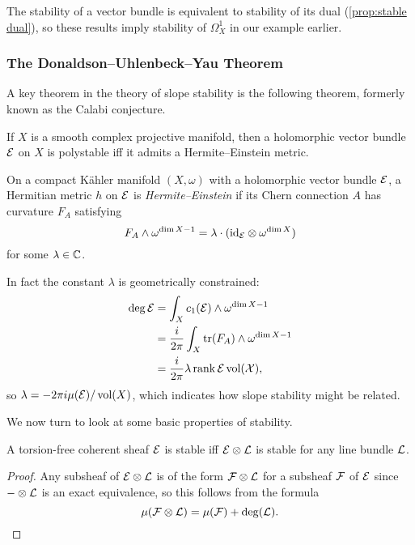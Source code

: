 The stability of a vector bundle is equivalent to stability of its dual
(\cref{prop:stable dual}), so these results imply stability of $\Omega^1_X$ in
our example earlier.

\subsubsection{The Donaldson--Uhlenbeck--Yau Theorem}

A key theorem in the theory of slope stability is the following theorem,
formerly known as the Calabi conjecture.

\begin{theorem}
    If $X$ is a smooth complex projective manifold, then a holomorphic vector
    bundle $\mathcal{E}$ on $X$ is polystable iff it admits a Hermite--Einstein
    metric.
\end{theorem}

\begin{definition}
    On a compact K\"ahler manifold $(X,\omega)$ with a holomorphic vector bundle
    $\mathcal{E}$, a Hermitian metric $h$ on $\mathcal{E}$ is \emph{Hermite--Einstein} if
    its Chern connection $A$ has curvature $F_A$ satisfying
    \begin{equation*}
        F_A\wedge\omega^{\dim X-1}
            = \lambda\cdot(\mathrm{id}_{\mathcal{E}}\otimes\omega^{\dim X})
    \end{equation*}
    for some $\lambda\in\mathbb{C}$.
\end{definition}

In fact the constant $\lambda$ is geometrically constrained:
\begin{align*}
    \deg\mathcal{E}
        &= \int_Xc_1(\mathcal{E})\wedge\omega^{\dim X-1} \\
        &= \frac{i}{2\pi}\int_X\operatorname{tr}(F_A)\wedge\omega^{\dim X-1} \\
        &= \frac{i}{2\pi}\lambda\operatorname{rank}\cal E\operatorname{vol}(X),
\end{align*}
so $\lambda=-2\pi i\mu(\mathcal{E})/\operatorname{vol}(X)$, which indicates how slope stability
might be related.

We now turn to look at some basic properties of stability.

\begin{proposition}\label{prop:line}
    A torsion-free coherent sheaf $\mathcal{E}$ is stable iff $\mathcal{E}\otimes\mathcal{L}$ is
    stable for any line bundle $\mathcal{L}$.
\end{proposition}

\begin{proof}
    Any subsheaf of $\mathcal{E}\otimes\mathcal{L}$ is of the form $\mathcal{F}\otimes\mathcal{L}$ for
    a subsheaf $\mathcal{F}$ of $\mathcal{E}$ since $-\otimes\mathcal{L}$ is an exact equivalence,
    so this follows from the formula
    \begin{equation*}
        \mu(\mathcal{F}\otimes\mathcal{L}) = \mu(\mathcal{F}) + \deg(\mathcal{L}).
    \end{equation*}
\end{proof}

